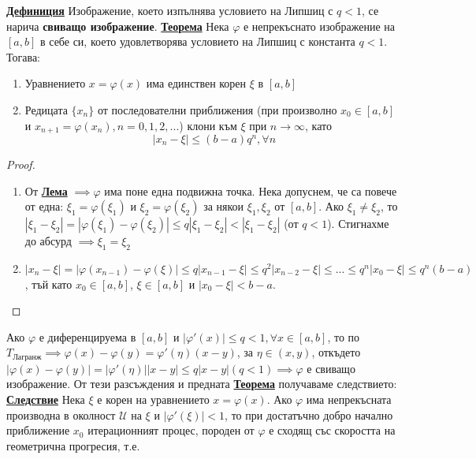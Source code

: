 \documentclass{article}
\begin{document}
\textbf{\underline{Дефиниция}}
Изображение, което изпълнява условието на Липшиц с $q < 1$, се нарича \textbf{свиващо изображение}. \newline\newline
\textbf{\underline{Теорема}} \newline
Нека $\varphi$ е непрекъснато изображение на $[a, b]$ в себе си, което удовлетворява условието на Липшиц с константа $q < 1$.
Тогава:
\begin{enumerate}
    \item Уравнението $x = \varphi(x)$ има единствен корен $\xi$ в $[a, b]$
    \item Редицата $\{x_n\}$ от последователни приближения (при произволно $x_0 \in [a, b]$ и $x_{n+1} = \varphi(x_n), n = 0, 1, 2, ...$) клони
    към $\xi$ при $n \rightarrow \infty$, като $$|x_n - \xi| \le (b - a)q^n, \forall n$$
\end{enumerate}
\begin{proof}
$ $
\begin{enumerate}
    \item От \textbf{\underline{Лема}} $\implies \varphi$ има поне една подвижна точка. Нека допуснем, че са повече от една: $\xi_1 = \varphi(\xi_1)$
    и $\xi_2 = \varphi(\xi_2)$ за някои $\xi_1, \xi_2$ от $[a, b]$. Ако $\xi_1 \neq \xi_2$, то $|\xi_1 - \xi_2| = |\varphi(\xi_1) - \varphi(\xi_2)|
    \le q|\xi_1 - \xi_2| < |\xi_1 - \xi_2|$ (от $q < 1$). Стигнахме до абсурд $\implies \xi_1 = \xi_2$
    \item $|x_n - \xi| = |\varphi(x_{n-1}) - \varphi(\xi)| \le q|x_{n-1} - \xi| \le q^2|x_{n-2} - \xi| \le ... \le q^n|x_0 - \xi| \le q^n(b - a)$, тъй като
    $x_0 \in [a, b]$, $\xi \in [a, b]$ и $|x_0 - \xi| < b - a$.
\end{enumerate}
\end{proof}
Ако $\varphi$ е диференцируема в $[a, b]$ и $|\varphi'(x)| \le q < 1, \forall x \in [a, b]$, то по $T_{\text{Лагранж}} \implies \varphi(x) - \varphi(y) =
\varphi'(\eta)(x - y)$, за $\eta \in (x, y)$, откъдето $|\varphi(x) - \varphi(y)| = |\varphi'(\eta)||x - y| \le q|x - y| (q < 1) \implies \varphi$ е свиващо
изображение. От тези разсъждения и предната \textbf{\underline{Теорема}} получаваме следствието: \newline\newline
\textbf{\underline{Следствие}} \newline
Нека $\xi$ е корен на уравнението $x = \varphi(x)$. Ако $\varphi$ има непрекъсната производна в околност $\mathcal{U}$ на $\xi$ и
$|\varphi'(\xi)| < 1$, то при достатъчно добро начално приближение $x_0$ итерационният процес, породен от $\varphi$ е сходящ със скоростта на геометрична прогресия, т.е.
\end{document}
